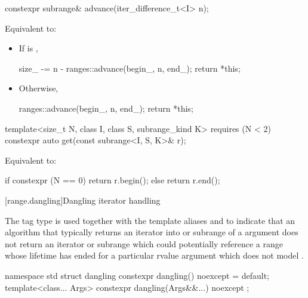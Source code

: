 %
\begin{itemdecl}
constexpr subrange& advance(iter_difference_t<I> n);
\end{itemdecl}

\begin{itemdescr}
\pnum
\effects Equivalent to:
\begin{itemize}
\item If  is ,
\begin{codeblock}
size_ -= n - ranges::advance(begin_, n, end_);
return *this;
\end{codeblock}
\item Otherwise,
\begin{codeblock}
ranges::advance(begin_, n, end_);
return *this;
\end{codeblock}
\end{itemize}
\end{itemdescr}

%
\begin{itemdecl}
template<size_t N, class I, class S, subrange_kind K>
  requires (N < 2)
constexpr auto get(const subrange<I, S, K>& r);
\end{itemdecl}

\begin{itemdescr}
\pnum
\effects Equivalent to:
\begin{codeblock}
if constexpr (N == 0)
  return r.begin();
else
  return r.end();
\end{codeblock}
\end{itemdescr}

[range.dangling]{Dangling iterator handling}

\pnum
The tag type  is used together
with the template aliases  and 
to indicate that an algorithm
that typically returns an iterator into or subrange of a  argument
does not return an iterator or subrange
which could potentially reference a range
whose lifetime has ended for a particular rvalue  argument
which does not model .
\begin{codeblock}
namespace std {
  struct dangling {
    constexpr dangling() noexcept = default;
    template<class... Args>
      constexpr dangling(Args&&...) noexcept { }
  };
}
\end{codeblock}

